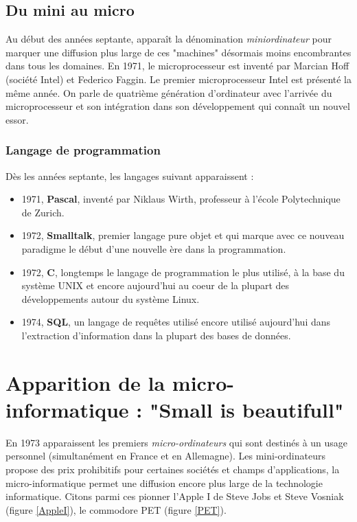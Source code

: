 \documentclass[a4paper,11pt]{book}
\begin{document}
\subsection{Du mini au micro}
Au début des années septante, apparaît la dénomination \textit{miniordinateur} pour marquer une diffusion plus large de ces "machines" désormais moins encombrantes dans tous les domaines.
En 1971, le microprocesseur est inventé par Marcian Hoff (société Intel) et Federico Faggin. Le premier microprocesseur Intel est présenté la même année. On parle de quatrième génération d'ordinateur avec l'arrivée du microprocesseur et son intégration dans son développement qui connaît un nouvel essor.


\subsubsection{Langage de programmation}
Dès les années septante, les langages suivant apparaissent :
\begin{itemize}
    \item 1971, \textbf{Pascal}, inventé par Niklaus Wirth, professeur à l'école Polytechnique de Zurich.
    \item 1972, \textbf{Smalltalk}, premier langage pure objet et qui marque avec ce nouveau paradigme le début d'une nouvelle ère dans la programmation.
    \item 1972, \textbf{C}, longtemps le langage de programmation le plus utilisé, à la base du système UNIX et encore aujourd'hui au coeur de la plupart des développements autour du système Linux.
    \item 1974, \textbf{SQL}, un langage de requêtes utilisé encore utilisé aujourd'hui dans l'extraction d'information dans la plupart des bases de données.
\end{itemize}

\section{Apparition de la micro-informatique : "Small is beautifull"}
En 1973 apparaissent les premiers \textit{micro-ordinateurs} qui sont destinés à un usage personnel (simultanément en France et en Allemagne). Les mini-ordinateurs propose des prix prohibitifs pour certaines sociétés et champs d'applications, la micro-informatique permet une diffusion encore plus large de la technologie informatique. Citons parmi ces pionner l'Apple I de Steve Jobs et Steve Vosniak (figure \ref{AppleI}), le commodore PET (figure \ref{PET}).
\end{document}
